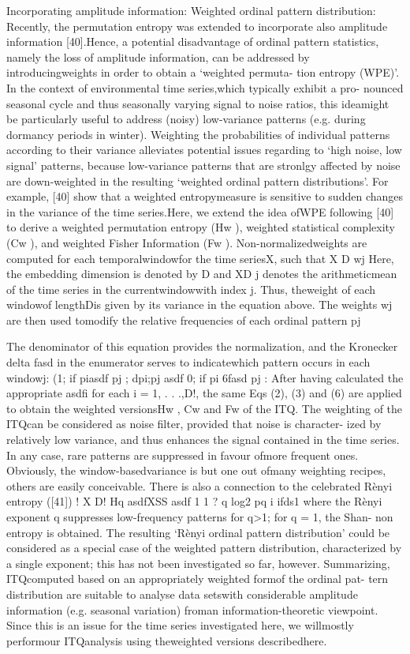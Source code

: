 Incorporating amplitude information: Weighted ordinal pattern distribution:
Recently, the permutation entropy was extended to incorporate also amplitude information [40].Hence, a potential disadvantage of ordinal pattern statistics, namely the loss of amplitude information, can be addressed by introducingweights in order to obtain a ‘weighted permuta- tion entropy (WPE)’. In the context of environmental time series,which typically exhibit a pro- nounced seasonal cycle and thus seasonally varying signal to noise ratios, this ideamight be particularly useful to address (noisy) low-variance patterns (e.g. during dormancy periods in winter). Weighting the probabilities of individual patterns according to their variance alleviates
potential issues regarding to ‘high noise, low signal’ patterns, because low-variance patterns that are stronlgy affected by noise are down-weighted in the resulting ‘weighted ordinal pattern distributions’. For example, [40] show that a weighted entropymeasure is sensitive to sudden changes in the variance of the time series.Here, we extend the idea ofWPE following [40] to derive a weighted permutation entropy (Hw
), weighted statistical complexity (Cw ), and
weighted Fisher Information (Fw
).
Non-normalizedweights are computed for each temporalwindowfor the time seriesX, such that
X
D wj Here, the embedding dimension is denoted by D and XD j denotes the arithmeticmean of the
time series in the currentwindowwith index j. Thus, theweight of each windowof lengthDis given by its variance in the equation above. The weights wj are then used tomodify the relative frequencies of each ordinal pattern pj

The denominator of this equation provides the normalization, and the Kronecker delta fasd
in the enumerator serves to indicatewhich pattern occurs in each windowj:
(1;
if piasdf pj
;
dpi;pj
asdf 0;
if pi
6fasd pj
:
After having calculated the appropriate asdfi for each i = 1, . . .,D!, the same Eqs (2), (3) and (6) are applied to obtain the weighted versionsHw
, Cw and Fw of the ITQ. The weighting of the ITQcan be considered as noise filter, provided that noise is character-
ized by relatively low variance, and thus enhances the signal contained in the time series. In any case, rare patterns are suppressed in favour ofmore frequent ones. Obviously, the window-basedvariance is but one out ofmany weighting recipes, others are
easily conceivable. There is also a connection to the celebrated Rènyi entropy ([41])
!
X
D!
Hq
asdfXSS asdf 1 1 ? q log2
pq i
ifds1
where the Rènyi exponent q suppresses low-frequency patterns for q>1; for q = 1, the Shan- non entropy is obtained. The resulting ‘Rènyi ordinal pattern distribution’ could be considered as a special case of the weighted pattern distribution, characterized by a single exponent; this has not been investigated so far, however. Summarizing, ITQcomputed based on an appropriately weighted formof the ordinal pat-
tern distribution are suitable to analyse data setswith considerable amplitude information (e.g. seasonal variation) froman information-theoretic viewpoint. Since this is an issue for the time series investigated here, we willmostly performour ITQanalysis using theweighted versions describedhere.

